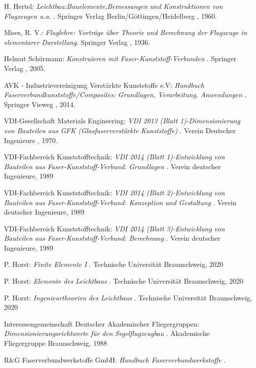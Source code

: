 \begin{thebibliography}{99}          
	H. Hertel:
	\textit {Leichtbau:Bauelemente,Bemessungen und Konstruktionen von Flugzeugen u.a. }.
	Springer Verlag Berlin/Göttingen/Heidelberg , 1960.
	
	Mises, R. V.:
	\textit {Fluglehre: Vorträge über Theorie und Berechnung der Flugzeuge in elementarer Darstellung}.
	Springer Verlag , 1936.
	
	Helmut Schürmann:
	\textit {Konstruieren mit Faser-Kunststoff-Verbunden }.
	Springer Verlag , 2005.
	
	AVK - Industrievereinigung Verstärkte Kunststoffe e.V:
	\textit {Handbuch Faserverbundkunststoffe/Composites: Grundlagen, Verarbeitung, Anwendungen }.
	Springer Vieweg , 2014.
	
	VDI-Gesellschaft Materials Engineering:
	\textit{VDI 2013 (Blatt 1)-Dimensionierung von Bauteilen aus GFK (Glasfaserverstärkte Kunststoffe) }.
	Verein Deutscher Ingenieure , 1970.
	
	VDI-Fachbereich Kunststofftechnik:
	\textit{VDI 2014 (Blatt 1)-Entwicklung von Bauteilen aus Faser-Kunststoff-Verbund: Grundlagen }.
	Verein deutscher Ingenieure, 1989
	
	VDI-Fachbereich Kunststofftechnik:
	\textit{VDI 2014 (Blatt 2)-Entwicklung von Bauteilen aus Faser-Kunststoff-Verbund: Konzeption und Gestaltung }.
	Verein deutscher Ingenieure, 1989
	
	VDI-Fachbereich Kunststofftechnik:
	\textit{VDI 2014 (Blatt 3)-Entwicklung von Bauteilen aus Faser-Kunststoff-Verbund: Berechnung }.
	Verein deutscher Ingenieure, 1989
	
	P. Horst:
	\textit{Finite Elemente I }.
	Technische Universität Braunschweig, 2020
	
	P. Horst:
	\textit{Elemente des Leichtbaus }.
	Technische Universität Braunschweig, 2020

	P. Horst:
	\textit{Ingenieurtheorien des Leichtbaus }.
	Technische Universität Braunschweig, 2020
	
	Interessengemeinschaft Deutscher Akademischer Fliegergruppen:
	\textit{Dimensionierungsrichtwerte für den Segelflugzeugbau }.
	Akademische Fliegergruppe Braunschweig, 1988

	R\&G Faserverbundwerkstoffe GmbH:
	\textit{Handbuch Faserverbundwerkstoffe }.
	


	
	
\end{thebibliography}